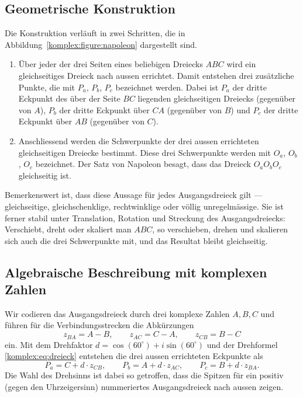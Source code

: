 \subsection{Geometrische Konstruktion
\label{komplex:subsection:konstruktion}}
Die Konstruktion verläuft in zwei Schritten,
die in Abbildung~\ref{komplex:figure:napoleon} dargestellt sind.
\begin{enumerate}
\item
Über jeder der drei Seiten eines beliebigen Dreiecks $ABC$ wird ein
gleichseitiges Dreieck nach aussen errichtet.
Damit entstehen drei zusätzliche Punkte, die mit $P_a$, $P_b$, $P_c$
bezeichnet werden.
Dabei ist $P_a$ der dritte Eckpunkt des über der Seite $BC$ liegenden
gleichseitigen Dreiecks (gegenüber von $A$),
$P_b$ der dritte Eckpunkt über $CA$ (gegenüber von $B$)
und $P_c$ der dritte Eckpunkt über $AB$ (gegenüber von $C$).
\item
Anschliessend werden die Schwerpunkte der drei aussen errichteten
gleichseitigen Dreiecke bestimmt.
Diese drei Schwerpunkte werden mit $O_a$, $O_b$, $O_c$ bezeichnet.
Der Satz von Napoleon besagt, dass das Dreieck $O_a O_b O_c$ gleichseitig
ist.
\end{enumerate}



Bemerkenswert ist, dass diese Aussage für jedes Ausgangsdreieck gilt ---
gleichseitige, gleich\-schenk\-lige, recht\-winklige oder völlig
unregelmässige.
Sie ist ferner stabil unter Translation, Rotation und Streckung des
Ausgangsdreiecks:
Verschiebt, dreht oder skaliert man $ABC$,
so verschieben, drehen und skalieren sich auch die drei Schwerpunkte mit,
und das Resultat bleibt gleichseitig.

%
%
\subsection{Algebraische Beschreibung mit komplexen Zahlen
\label{komplex:subsection:algebraisch-napoleon}}
Wir codieren das Aus\-gangs\-dreieck durch drei kom\-plexe Zahlen
$A, B, C$ und führen für die Ver\-bindungs\-strecken die Abkürzungen
\begin{equation}
z_{BA} = A - B ,
\qquad
z_{AC} = C - A ,
\qquad
z_{CB} = B - C
\label{komplex:eq:verbindungsstrecken}
\end{equation}
ein.
Mit dem Drehfaktor $d = \cos(60^\circ) + i \sin(60^\circ)$ und der
Drehformel \eqref{komplex:eq:dreieck} entstehen die drei aussen
errichteten Eckpunkte als
\begin{equation}
P_a = C + d \cdot z_{CB} ,
\qquad
P_b = A + d \cdot z_{AC} ,
\qquad
P_c = B + d \cdot z_{BA} .
\label{komplex:eq:p-punkte}
\end{equation}
Die Wahl des Drehsinns ist dabei so getroffen, dass die Spitzen für ein
positiv (gegen den Uhrzeigersinn) nummeriertes Ausgangsdreieck nach aussen
zeigen.

